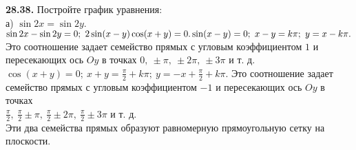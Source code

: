 \documentclass[a5paper,10pt]{article}
\begin{document}
\medskip
\noindent
{\bf 28.38.} Постройте график уравнения:\\
а) $\sin2x=\sin2y.$\\
$\sin2x-\sin2y=0;\ 2\sin(x-y)\cos(x+y)=0.\\
\sin(x-y)=0;\ x-y=k\pi;\ y=x-k\pi.$ Это соотношение задает семейство прямых с угловым коэффициентом $1$ и пересекающих ось $Oy$ в точках $0,\ \pm\pi,\ \pm2\pi,\ \pm3\pi$ и т. д.\\
$\displaystyle \cos(x+y)=0;\ x+y=\frac{\pi}{2}+k\pi;\ y=-x+\frac{\pi}{2}+k\pi.$ Это соотношение задает семейство прямых с угловым коэффициентом $-1$ и пересекающих ось $Oy$ в точках\\
$\displaystyle \frac{\pi}{2},\ \frac{\pi}{2}\pm\pi,\ \frac{\pi}{2}\pm2\pi,\ \frac{\pi}{2}\pm3\pi$ и т. д.\\[3pt]
Эти два семейства прямых образуют равномерную прямоугольную сетку на плоскости.

\bigskip
{}
\end{document}
